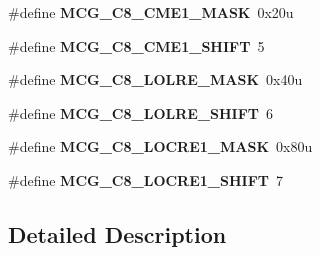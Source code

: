 \begin{DoxyCompactItemize}
\item 
\#define {\bfseries M\+C\+G\+\_\+\+C8\+\_\+\+C\+M\+E1\+\_\+\+M\+A\+SK}~0x20u\hypertarget{group__MCG__Register__Masks_ga9e0e0db74d7e18fffad7b4f08eb74524}{}\label{group__MCG__Register__Masks_ga9e0e0db74d7e18fffad7b4f08eb74524}

\item 
\#define {\bfseries M\+C\+G\+\_\+\+C8\+\_\+\+C\+M\+E1\+\_\+\+S\+H\+I\+FT}~5\hypertarget{group__MCG__Register__Masks_ga00dc55bd1e2197897d59597dd57592ba}{}\label{group__MCG__Register__Masks_ga00dc55bd1e2197897d59597dd57592ba}

\item 
\#define {\bfseries M\+C\+G\+\_\+\+C8\+\_\+\+L\+O\+L\+R\+E\+\_\+\+M\+A\+SK}~0x40u\hypertarget{group__MCG__Register__Masks_gaeab391a933aec2eeb1ffdbc772f714e2}{}\label{group__MCG__Register__Masks_gaeab391a933aec2eeb1ffdbc772f714e2}

\item 
\#define {\bfseries M\+C\+G\+\_\+\+C8\+\_\+\+L\+O\+L\+R\+E\+\_\+\+S\+H\+I\+FT}~6\hypertarget{group__MCG__Register__Masks_ga247e347342c951c4b8044bece01311fb}{}\label{group__MCG__Register__Masks_ga247e347342c951c4b8044bece01311fb}

\item 
\#define {\bfseries M\+C\+G\+\_\+\+C8\+\_\+\+L\+O\+C\+R\+E1\+\_\+\+M\+A\+SK}~0x80u\hypertarget{group__MCG__Register__Masks_gad7fe66acc8b6391ccfe2c53b61a9b119}{}\label{group__MCG__Register__Masks_gad7fe66acc8b6391ccfe2c53b61a9b119}

\item 
\#define {\bfseries M\+C\+G\+\_\+\+C8\+\_\+\+L\+O\+C\+R\+E1\+\_\+\+S\+H\+I\+FT}~7\hypertarget{group__MCG__Register__Masks_gad97e280f47539832dda56a845055c921}{}\label{group__MCG__Register__Masks_gad97e280f47539832dda56a845055c921}

\end{DoxyCompactItemize}


\subsection{Detailed Description}
